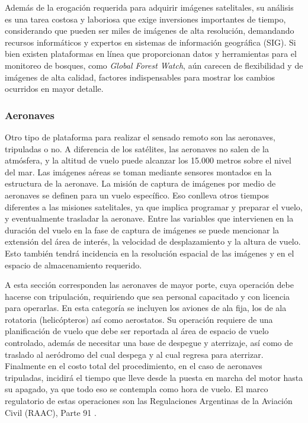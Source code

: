 Además de la erogación requerida para adquirir imágenes satelitales, su análisis es una tarea costosa y laboriosa que exige inversiones importantes de tiempo, considerando que pueden ser miles de imágenes de alta resolución, demandando recursos informáticos y expertos en sistemas de información geográfica (SIG). Si bien existen plataformas en línea que proporcionan datos y herramientas para el monitoreo de bosques, como \textit{Global Forest Watch}, aún carecen de flexibilidad y de imágenes de alta calidad, factores indispensables para mostrar los cambios ocurridos en mayor detalle.


\subsubsection{Aeronaves}
Otro tipo de plataforma para realizar el sensado remoto son las aeronaves, tripuladas o no. A diferencia de los satélites, las aeronaves no salen de la atmósfera, y la altitud de vuelo puede alcanzar los 15.000 metros sobre el nivel del mar. Las imágenes aéreas se toman mediante sensores montados en la estructura de la aeronave. La misión de captura de imágenes por medio de aeronaves se definen para un vuelo específico. Eso conlleva otros tiempos diferentes a las misiones satelitales, ya que implica programar y preparar el vuelo, y eventualmente trasladar la aeronave. Entre las variables que intervienen en la duración del vuelo en la fase de captura de imágenes se puede mencionar la extensión del área de interés, la velocidad de desplazamiento y la altura de vuelo. Esto también tendrá incidencia en la resolución espacial de las imágenes y en el espacio de almacenamiento requerido.

A esta sección corresponden las aeronaves de mayor porte, cuya operación debe hacerse con tripulación, requiriendo que sea personal capacitado y con licencia para operarlas. En esta categoría se incluyen los aviones de ala fija, los de ala rotatoria (helicópteros) así como aerostatos. Su operación requiere de una planificación de vuelo que debe ser reportada al área de espacio de vuelo controlado, además de necesitar una base de despegue y aterrizaje, así como de traslado al aeródromo del cual despega y al cual regresa para aterrizar.   Finalmente en el costo total del procedimiento, en el caso de aeronaves tripuladas, incidirá el tiempo que lleve desde la puesta en marcha del motor hasta su apagado, ya que todo eso se contempla como hora de vuelo.
El marco regulatorio de estas operaciones son las Regulaciones Argentinas de la Aviación Civil (RAAC), Parte 91 \cite{noauthor_infoleg_nodate-1}. 


